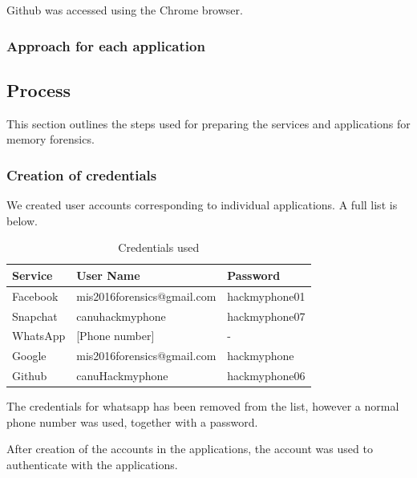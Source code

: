 Github was accessed using the Chrome browser.
\subsubsection{Approach for each application}
\subsection{Process} %
This section outlines the steps used for preparing the services and applications for memory forensics.

\subsubsection{Creation of credentials}
We created user accounts corresponding to individual applications. A full list is below.\\
\begin{table}
\begin{tabular}{l|l|l}
Service & User Name & Password \\ 
\hline 
Facebook & mis2016forensics@gmail.com & hackmyphone01 \\ 
Snapchat & canuhackmyphone & hackmyphone07 \\ 
WhatsApp & [Phone number] & - \\ 
Google & mis2016forensics@gmail.com & hackmyphone \\ 
Github & canuHackmyphone & hackmyphone06 \\ 
\end{tabular} 
\caption{Credentials used}
\label{tbl:credentials}
\end{table}

The credentials for whatsapp has been removed from the list, however a normal phone number was used, together with a password.

After creation of the accounts in the applications, the account was used to authenticate with the applications.

